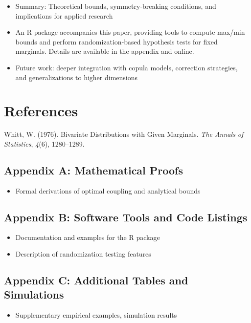 \documentclass[
  12pt,
]{article}
\providecommand{\tightlist}{%
  \setlength{\itemsep}{0pt}\setlength{\parskip}{0pt}}\usepackage{longtable,booktabs,array}
\newlength{\cslhangindent}
\newenvironment{CSLReferences}[2] %
 {\begin{list}{}{%
  \setlength{\itemindent}{0pt}
  \setlength{\leftmargin}{0pt}
  \setlength{\parsep}{0pt}
  \ifodd #1
   \setlength{\leftmargin}{\cslhangindent}
   \setlength{\itemindent}{-1\cslhangindent}
  \fi
  \setlength{\itemsep}{#2\baselineskip}}}
 {\end{list}}
\begin{document}
\begin{itemize}
\tightlist
\item
  Summary: Theoretical bounds, symmetry-breaking conditions, and
  implications for applied research
\item
  An R package accompanies this paper, providing tools to compute
  max/min bounds and perform randomization-based hypothesis tests for
  fixed marginals. Details are available in the appendix and online.
\item
  Future work: deeper integration with copula models, correction
  strategies, and generalizations to higher dimensions
\end{itemize}

\newpage

\section{References}\label{references}

\label{refs}
\begin{CSLReferences}{1}{0}
Whitt, W. (1976). Bivariate {Distributions} with {Given Marginals}.
\emph{The Annals of Statistics}, \emph{4}(6), 1280--1289.

\end{CSLReferences}

\newpage

\appendix

\subsection{Appendix A: Mathematical
Proofs}\label{appendix-a-mathematical-proofs}

\begin{itemize}
\tightlist
\item
  Formal derivations of optimal coupling and analytical bounds
\end{itemize}

\subsection{Appendix B: Software Tools and Code
Listings}\label{appendix-b-software-tools-and-code-listings}

\begin{itemize}
\tightlist
\item
  Documentation and examples for the R package\\
\item
  Description of randomization testing features
\end{itemize}

\subsection{Appendix C: Additional Tables and
Simulations}\label{appendix-c-additional-tables-and-simulations}

\begin{itemize}
\tightlist
\item
  Supplementary empirical examples, simulation results
\end{itemize}
\end{document}
